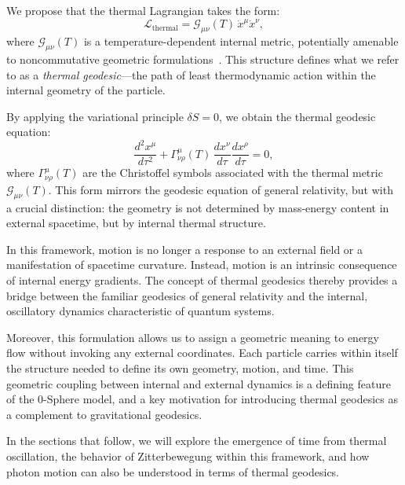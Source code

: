 \documentclass[%
 reprint,
 amsmath,amssymb,
 aps,
]{revtex4-1}
\numberwithin{equation}{section}%
\begin{document}
We propose that the thermal Lagrangian takes the form:
\begin{equation} \label{eq:thermal_lagrangian}
\mathcal{L}_{\text{thermal}} = \mathcal{G}_{\mu\nu}(T) \, \dot{x}^\mu \dot{x}^\nu,
\end{equation}
where $\mathcal{G}_{\mu\nu}(T)$ is a temperature-dependent internal metric, potentially amenable to noncommutative geometric formulations~\cite{connes1994}. This structure defines what we refer to as a \textit{thermal geodesic}---the path of least thermodynamic action within the internal geometry of the particle.

By applying the variational principle $\delta S = 0$, we obtain the thermal geodesic equation:
\begin{equation} \label{eq:thermal_geodesic_eq}
\frac{d^2 x^\mu}{d\tau^2} + \Gamma^\mu_{\nu\rho}(T) \, \frac{dx^\nu}{d\tau} \frac{dx^\rho}{d\tau} = 0,
\end{equation}
where $\Gamma^\mu_{\nu\rho}(T)$ are the Christoffel symbols associated with the thermal metric $\mathcal{G}_{\mu\nu}(T)$. This form mirrors the geodesic equation of general relativity, but with a crucial distinction: the geometry is not determined by mass-energy content in external spacetime, but by internal thermal structure.

In this framework, motion is no longer a response to an external field or a manifestation of spacetime curvature. Instead, motion is an intrinsic consequence of internal energy gradients. The concept of thermal geodesics thereby provides a bridge between the familiar geodesics of general relativity and the internal, oscillatory dynamics characteristic of quantum systems.

Moreover, this formulation allows us to assign a geometric meaning to energy flow without invoking any external coordinates. Each particle carries within itself the structure needed to define its own geometry, motion, and time. This geometric coupling between internal and external dynamics is a defining feature of the 0-Sphere model, and a key motivation for introducing thermal geodesics as a complement to gravitational geodesics.

In the sections that follow, we will explore the emergence of time from thermal oscillation, the behavior of Zitterbewegung within this framework, and how photon motion can also be understood in terms of thermal geodesics.


\end{document}

